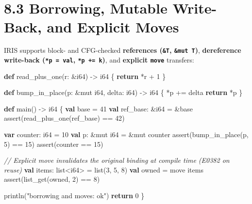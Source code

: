 \documentclass[
  english,
  oneside]{book}
\newenvironment{Shaded}{\begin{snugshade}}{\end{snugshade}}
\newcommand{\CommentTok}[1]{\textcolor[rgb]{0.42,0.60,0.33}{\textit{#1}}}
\newcommand{\ControlFlowTok}[1]{\textcolor[rgb]{0.77,0.53,0.75}{\textbf{#1}}}
\newcommand{\DataTypeTok}[1]{\textcolor[rgb]{0.31,0.79,0.69}{#1}}
\newcommand{\DecValTok}[1]{\textcolor[rgb]{0.71,0.81,0.66}{#1}}
\newcommand{\FunctionTok}[1]{\textcolor[rgb]{0.86,0.86,0.67}{#1}}
\newcommand{\KeywordTok}[1]{\textcolor[rgb]{0.34,0.61,0.84}{\textbf{#1}}}
\newcommand{\NormalTok}[1]{\textcolor[rgb]{0.83,0.83,0.83}{#1}}
\newcommand{\OperatorTok}[1]{\textcolor[rgb]{0.83,0.83,0.83}{#1}}
\newcommand{\StringTok}[1]{\textcolor[rgb]{0.81,0.57,0.47}{#1}}
\begin{document}
\section{8.3 Borrowing, Mutable Write-Back, and Explicit
Moves}\label{borrowing-mutable-write-back-and-explicit-moves}

IRIS supports block- and CFG-checked \textbf{references (\texttt{\&T},
\texttt{\&mut\ T})}, \textbf{dereference write-back
(\texttt{*p\ =\ val}, \texttt{*p\ +=\ k})}, and \textbf{explicit
\texttt{move}} transfers:

\begin{Shaded}
\begin{Highlighting}[]
\KeywordTok{def}\NormalTok{ read\_plus\_one(r: }\OperatorTok{\&}\DataTypeTok{i64}\NormalTok{) }\OperatorTok{{-}\textgreater{}} \DataTypeTok{i64}\NormalTok{ \{}
    \ControlFlowTok{return} \OperatorTok{*}\NormalTok{r }\OperatorTok{+} \DecValTok{1}
\NormalTok{\}}

\KeywordTok{def}\NormalTok{ bump\_in\_place(p: }\OperatorTok{\&}\NormalTok{mut }\DataTypeTok{i64}\NormalTok{, delta: }\DataTypeTok{i64}\NormalTok{) }\OperatorTok{{-}\textgreater{}} \DataTypeTok{i64}\NormalTok{ \{}
    \OperatorTok{*}\NormalTok{p }\OperatorTok{+=}\NormalTok{ delta}
    \ControlFlowTok{return} \OperatorTok{*}\NormalTok{p}
\NormalTok{\}}

\KeywordTok{def}\NormalTok{ main() }\OperatorTok{{-}\textgreater{}} \DataTypeTok{i64}\NormalTok{ \{}
    \KeywordTok{val}\NormalTok{ base }\OperatorTok{=} \DecValTok{41}
    \KeywordTok{val}\NormalTok{ ref\_base: }\OperatorTok{\&}\DataTypeTok{i64} \OperatorTok{=} \OperatorTok{\&}\NormalTok{base}
    \FunctionTok{assert}\NormalTok{(read\_plus\_one(ref\_base) }\OperatorTok{==} \DecValTok{42}\NormalTok{)}

    \KeywordTok{var}\NormalTok{ counter: }\DataTypeTok{i64} \OperatorTok{=} \DecValTok{10}
    \KeywordTok{val}\NormalTok{ p: }\OperatorTok{\&}\NormalTok{mut }\DataTypeTok{i64} \OperatorTok{=} \OperatorTok{\&}\NormalTok{mut counter}
    \FunctionTok{assert}\NormalTok{(bump\_in\_place(p, }\DecValTok{5}\NormalTok{) }\OperatorTok{==} \DecValTok{15}\NormalTok{)}
    \FunctionTok{assert}\NormalTok{(counter }\OperatorTok{==} \DecValTok{15}\NormalTok{)}

    \CommentTok{// Explicit move invalidates the original binding at compile time (E0382 on reuse)}
    \KeywordTok{val}\NormalTok{ items: }\DataTypeTok{list}\OperatorTok{\textless{}}\DataTypeTok{i64}\OperatorTok{\textgreater{}} \OperatorTok{=} \DataTypeTok{list}\NormalTok{(}\DecValTok{3}\NormalTok{, }\DecValTok{5}\NormalTok{, }\DecValTok{8}\NormalTok{)}
    \KeywordTok{val}\NormalTok{ owned }\OperatorTok{=}\NormalTok{ move items}
    \FunctionTok{assert}\NormalTok{(}\FunctionTok{list\_get}\NormalTok{(owned, }\DecValTok{2}\NormalTok{) }\OperatorTok{==} \DecValTok{8}\NormalTok{)}

\NormalTok{    println(}\StringTok{"borrowing and moves: ok"}\NormalTok{)}
    \ControlFlowTok{return} \DecValTok{0}
\NormalTok{\}}
\end{Highlighting}
\end{Shaded}
\end{document}
